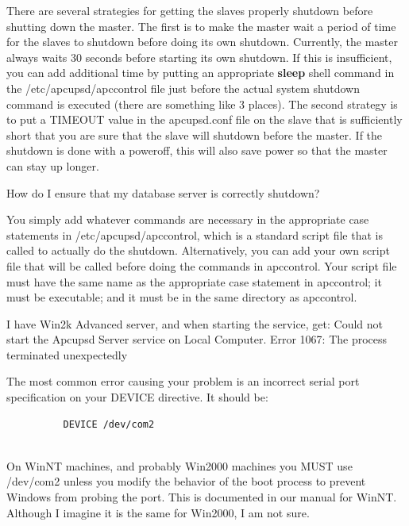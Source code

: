 {{{{{{\begin{description}
{{\item [A:]
   There are several strategies for getting the slaves properly shutdown before
shutting down the master. The first is to make the master wait a period of
time for the slaves to shutdown before doing its own shutdown. Currently, the
master always waits 30 seconds before starting its own shutdown. If this is
insufficient, you can add additional time by putting an appropriate {\bf
sleep} shell command in the /etc/apcupsd/apccontrol file just before the
actual system shutdown command is executed (there are something like 3
places). The second strategy is to put a TIMEOUT value in the apcupsd.conf
file on the slave that is sufficiently short that you are sure that the slave
will shutdown before the master. If the shutdown is done with a poweroff, this
will also save power so that the master can stay up longer.  

\item [Q:]
   How do I ensure that my database server is correctly shutdown?  

\item [A:]
   You simply add whatever commands are necessary in the appropriate case
statements in /etc/apcupsd/apccontrol, which is a standard script file that is
called to actually do the shutdown. Alternatively, you can add your own script
file that will be called before doing the commands in apccontrol. Your script
file must have the same name as the appropriate case statement in apccontrol;
it must be executable; and it must be in the same directory as apccontrol.  

\item [Q:]
   I have Win2k Advanced server, and when starting the service, get: Could not
start the Apcupsd Server service on Local Computer. Error 1067: The process
terminated unexpectedly  

\item [A:]
   The most common error causing your problem is an incorrect serial port
specification on your DEVICE directive. It should be:  

\footnotesize
\begin{verbatim}
          DEVICE /dev/com2
     
\end{verbatim}
\normalsize

On WinNT machines, and probably Win2000 machines you MUST use /dev/com2 unless
you modify the behavior of the boot process to prevent Windows from probing
the port. This is documented in our manual for WinNT. Although I imagine it is
the same for Win2000, I am not sure.  

}}
\end{description}}}}}}}

